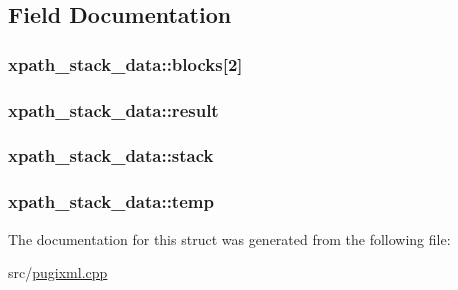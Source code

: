 \subsection{Field Documentation}
\hypertarget{structxpath__stack__data_a6821cc444dd65d997467fd3f757f4aff}{
\subsubsection[{blocks}]{ {\bf xpath\_\-stack\_\-data::blocks}\mbox{[}2\mbox{]}}}
\label{structxpath__stack__data_a6821cc444dd65d997467fd3f757f4aff}
\hypertarget{structxpath__stack__data_ab073a685c66383ded44076993afe62d6}{
\subsubsection[{result}]{ {\bf xpath\_\-stack\_\-data::result}}}
\label{structxpath__stack__data_ab073a685c66383ded44076993afe62d6}
\hypertarget{structxpath__stack__data_ad26a92328f9aaf83fa62cb6695dbee90}{
\subsubsection[{stack}]{ {\bf xpath\_\-stack\_\-data::stack}}}
\label{structxpath__stack__data_ad26a92328f9aaf83fa62cb6695dbee90}
\hypertarget{structxpath__stack__data_a56e6bb486d52f4c5c2d02370e1b41058}{
\subsubsection[{temp}]{ {\bf xpath\_\-stack\_\-data::temp}}}
\label{structxpath__stack__data_a56e6bb486d52f4c5c2d02370e1b41058}


The documentation for this struct was generated from the following file:\begin{DoxyCompactItemize}
\item 
src/\hyperlink{pugixml_8cpp}{pugixml.cpp}\end{DoxyCompactItemize}
